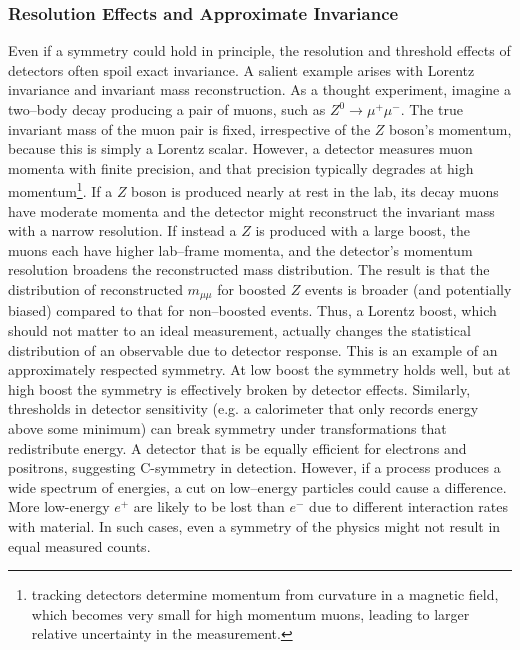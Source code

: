        \subsubsection{Resolution Effects and Approximate Invariance}
            Even if a symmetry could hold in principle, the resolution and threshold effects of detectors often spoil exact invariance.
            A salient example arises with Lorentz invariance and invariant mass reconstruction.
            As a thought experiment, imagine a two--body decay producing a pair of muons, such as $Z^0 \to \mu^+\mu^-$.
            The true invariant mass of the muon pair is fixed, irrespective of the $Z$ boson’s momentum, because this is simply a Lorentz scalar.
            However, a detector measures muon momenta with finite precision, and that precision typically degrades at high momentum\footnote{tracking detectors determine momentum from curvature in a magnetic field, which becomes very small for high momentum muons, leading to larger relative uncertainty in the measurement.}.
            If a $Z$ boson is produced nearly at rest in the lab, its decay muons have moderate momenta and the detector might reconstruct the invariant mass with a narrow resolution.
            If instead a $Z$ is produced with a large boost, the muons each have higher lab--frame momenta, and the detector’s momentum resolution broadens the reconstructed mass distribution.
            The result is that the distribution of reconstructed $m_{\mu\mu}$ for boosted $Z$ events is broader (and potentially biased) compared to that for non--boosted events.
            Thus, a Lorentz boost, which should not matter to an ideal measurement, actually changes the statistical distribution of an observable due to detector response.
            This is an example of an approximately respected symmetry.
            At low boost the symmetry holds well, but at high boost the symmetry is effectively broken by detector effects.
            Similarly, thresholds in detector sensitivity (e.g. a calorimeter that only records energy above some minimum) can break symmetry under transformations that redistribute energy.
            A detector that is be equally efficient for electrons and positrons, suggesting C-symmetry in detection.
            However, if a process produces a wide spectrum of energies, a cut on low--energy particles could cause a difference.
            More low-energy $e^+$ are likely to be lost than $e^-$ due to different interaction rates with material.
            In such cases, even a symmetry of the physics might not result in equal measured counts.

